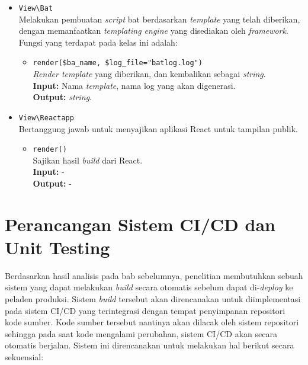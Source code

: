 \begin{itemize}
        \item \texttt{View\textbackslash Bat} \\
            Melakukan pembuatan \textit{script} bat berdasarkan
            \textit{template} yang telah diberikan, dengan memanfaatkan
            \textit{templating engine} yang disediakan oleh \textit{framework}.
            Fungsi yang terdapat pada kelas ini adalah:
            \begin{itemize}
                \item \texttt{render(\$ba\_name, \$log\_file="batlog.log")} \\
                    \textit{Render template} yang diberikan, dan kembalikan
                    sebagai \textit{string}. \\
                    \textbf{Input:} Nama \textit{template}, nama log yang akan
                    digenerasi.\\
                    \textbf{Output:} \textit{string}.
            \end{itemize}
        
        \item \texttt{View\textbackslash Reactapp} \\
            Bertanggung jawab untuk menyajikan aplikasi React untuk tampilan
            publik.
            \begin{itemize}
                \item \texttt{render()} \\
                    Sajikan hasil \textit{build} dari React. \\
                    \textbf{Input:} -\\
                    \textbf{Output:} -
            \end{itemize}
    \end{itemize}


\section{Perancangan Sistem CI/CD dan Unit Testing}
    Berdasarkan hasil analisis pada bab sebelumnya, penelitian membutuhkan
    sebuah sistem yang dapat melakukan \textit{build} secara otomatis sebelum
    dapat di-\textit{deploy} ke peladen produksi. Sistem \textit{build} tersebut
    akan direncanakan untuk diimplementasi pada sistem CI/CD yang terintegrasi
    dengan tempat penyimpanan repositori kode sumber. Kode sumber tersebut
    nantinya akan dilacak oleh sistem repositori sehingga pada saat kode
    mengalami perubahan, sistem CI/CD akan secara otomatis berjalan. Sistem ini
    direncanakan untuk melakukan hal berikut secara sekuensial:
    
